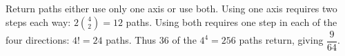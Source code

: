 Return paths either use only one axis or use both. Using one axis requires two steps each way: $2\binom42=12$ paths. Using both requires one step in each of the four directions: $4!=24$ paths. Thus $36$ of the $4^4=256$ paths return, giving $\boxed{\dfrac{9}{64}}$.
